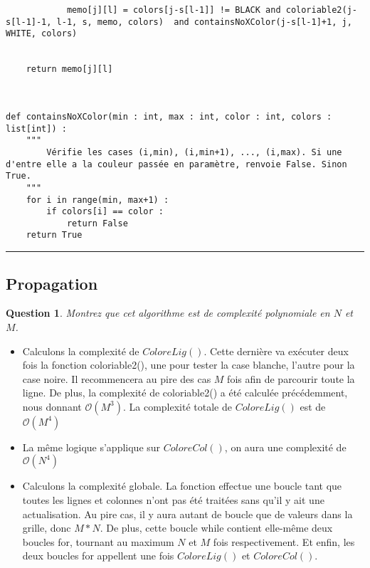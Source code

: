 \documentclass[a4paper,12pt]{article}
\newtheorem{exo}{Question}
\begin{document}
\begin{lstlisting}
            memo[j][l] = colors[j-s[l-1]] != BLACK and coloriable2(j-s[l-1]-1, l-1, s, memo, colors)  and containsNoXColor(j-s[l-1]+1, j, WHITE, colors)
            
        
    return memo[j][l]



def containsNoXColor(min : int, max : int, color : int, colors : list[int]) :
    """
        Vérifie les cases (i,min), (i,min+1), ..., (i,max). Si une d'entre elle a la couleur passée en paramètre, renvoie False. Sinon True.
    """
    for i in range(min, max+1) :
        if colors[i] == color :
            return False
    return True

\end{lstlisting}

\noindent\rule{\textwidth}{1pt}
\newpage


\subsection{Propagation}

\begin{exo}
	Montrez que cet algorithme est de complexité polynomiale en $N$ et $M$.
\end{exo}

\begin{itemize}
	\item Calculons la complexité de $ColoreLig()$. Cette dernière va exécuter deux fois la fonction coloriable2(), une pour tester la case blanche, l'autre pour la case noire. Il recommencera au pire des cas $M$ fois afin de parcourir toute la ligne. De plus, la complexité de coloriable2() a été calculée précédemment, nous donnant $\mathcal{O}(M^3)$. La complexité totale de $ColoreLig()$ est de $\mathcal{O}(M^4)$
	\item La même logique s'applique sur $ColoreCol()$, on aura une complexité de $\mathcal{O}(N^4)$
	\item Calculons la complexité globale. La fonction effectue une boucle tant que toutes les lignes et colonnes n'ont pas été traitées sans qu'il y ait une actualisation. Au pire cas, il y aura autant de boucle que de valeurs dans la grille, donc $M*N$. De plus, cette boucle while contient elle-même deux boucles for, tournant au maximum $N$ et $M$ fois respectivement. Et enfin, les deux boucles for appellent une fois $ColoreLig()$ et $ColoreCol()$.\\
\end{itemize}
\end{document}
